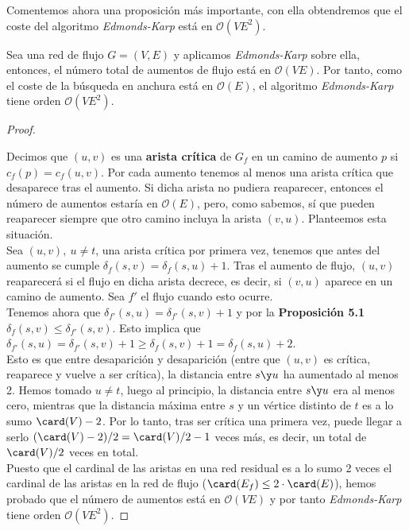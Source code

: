 Comentemos ahora una proposición más importante, con ella obtendremos que el coste del algoritmo \textit{Edmonds-Karp} está en $\mathcal{O}(VE^2)$.

\begin{proposicion} Sea una red de flujo $G=(V,E)$ y aplicamos \textit{Edmonds-Karp} sobre ella, entonces, el número total de aumentos de flujo está en $\mathcal{O}(VE)$. Por tanto, como el coste de la búsqueda en anchura está en $\mathcal{O}(E)$, el algoritmo \textit{Edmonds-Karp} tiene orden $\mathcal{O}(VE^2)$.

\begin{proof}\ 

Decimos que $(u,v)$ es una \textbf{arista crítica} de $G_f$ en un camino de aumento $p$ si $c_f(p)=c_f(u,v)$. Por cada aumento tenemos al menos una arista crítica que desaparece tras el aumento. Si dicha arista no pudiera reaparecer, entonces el número de aumentos estaría en $\mathcal{O}(E)$, pero, como sabemos, sí que pueden reaparecer siempre que otro camino incluya la arista $(v,u)$. Planteemos esta situación.\\

Sea $(u,v),\ u\neq t$, una arista crítica por primera vez, tenemos que antes del aumento se cumple $\delta_f(s,v)= \delta_f(s,u) + 1$. Tras el aumento de flujo, $(u,v)$ reaparecerá si el flujo en dicha arista decrece, es decir, si $(v,u)$ aparece en un camino de aumento. Sea $f'$ el flujo cuando esto ocurre.\\

Tenemos ahora que $\delta_{f'}(s,u)= \delta_{f'}(s,v) + 1$ y por la \textbf{Proposición 5.1} $\delta_f(s,v) \leq \delta_{f'}(s,v)$. Esto implica que $\delta_{f'}(s,u)= \delta_{f'}(s,v) + 1 \geq \delta_f(s,v) + 1 =\delta_f(s,u) +2$.\\

Esto es que entre desaparición y desaparición (entre que $(u,v)$ es crítica, reaparece y vuelve a ser crítica), la distancia entre $s\y u$ ha aumentado al menos 2. Hemos tomado $u\neq t$, luego al principio, la distancia entre $s\y u$ era al menos cero, mientras que la distancia máxima entre $s$ y un vértice distinto de $t$ es a lo sumo $\card(V) - 2$. Por lo tanto, tras ser crítica una primera vez, puede llegar a serlo $(\card(V) - 2)/2= \card(V)/2 - 1$ veces más, es decir, un total de $\card(V)/2$ veces en total.\\

Puesto que el cardinal de las aristas en una red residual es a lo sumo 2 veces el cardinal de las aristas en la red de flujo ($\card(E_f)\leq 2\cdot\card(E)$), hemos probado que el número de aumentos está en $\mathcal{O}(VE)$ y por tanto \textit{Edmonds-Karp} tiene orden $\mathcal{O}(VE^2)$.
\end{proof}
\end{proposicion}